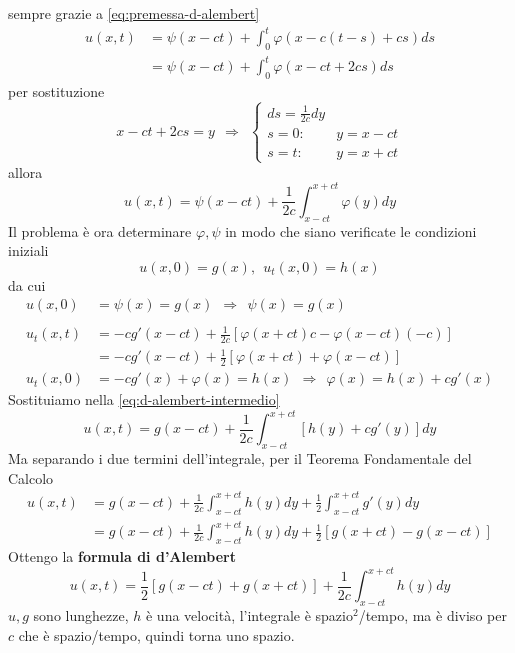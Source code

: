 \documentclass[10pt,a4paper,twoside,openright]{book}
\begin{document}
sempre grazie a \eqref{eq:premessa-d-alembert}
\begin{align*}
	u( x,t) & =\psi ( x-ct) +\int ^{t}_{0} \varphi ( x-c( t-s) +cs) ds \\
	        & =\psi ( x-ct) +\int ^{t}_{0} \varphi ( x-ct+2cs) ds      
\end{align*}
per sostituzione
\begin{equation*}
	x-ct+2cs=y\ \ \Rightarrow \ \ \begin{cases}
	ds=\frac{1}{2c} dy & \\
	s=0: & y=x-ct\\
	s=t: & y=x+ct
	\end{cases}
\end{equation*}
allora
\begin{equation}
	u( x,t) =\psi ( x-ct) +\frac{1}{2c}\int ^{x+ct}_{x-ct} \varphi ( y) dy
	\label{eq:d-alembert-intermedio}
\end{equation}
Il problema è ora determinare $\varphi ,\psi $ in modo che siano verificate le condizioni iniziali
\begin{equation*}
	u( x,0) =g( x) ,\ \ u_{t}( x,0) =h( x)
\end{equation*}
da cui
\begin{align*}
	u( x,0)     & =\psi ( x) =g( x) \ \ \Rightarrow \ \ \boxed{\psi ( x) =g( x)}                          \\
	            &                                                                                         \\
	u_{t}( x,t) & =-cg'( x-ct) +\frac{1}{2c}[ \varphi ( x+ct) c-\varphi ( x-ct)( -c)]                     \\
	            & =-cg'( x-ct) +\frac{1}{2}[ \varphi ( x+ct) +\varphi ( x-ct)]                            \\
	u_{t}( x,0) & =-cg'( x) +\varphi ( x) =h( x) \ \ \Rightarrow \ \ \boxed{\varphi ( x) =h( x) +cg'( x)} 
\end{align*}
Sostituiamo nella \eqref{eq:d-alembert-intermedio}
\begin{equation*}
	u( x,t) =g( x-ct) +\frac{1}{2c}\int ^{x+ct}_{x-ct}[ h( y) +cg'( y)] dy
\end{equation*}
Ma separando i due termini dell'integrale, per il Teorema Fondamentale del Calcolo
\begin{align*}
	u( x,t) & =g( x-ct) +\frac{1}{2c}\int ^{x+ct}_{x-ct} h( y) dy+\frac{1}{2}\int ^{x+ct}_{x-ct} g'( y) dy \\
	        & =g( x-ct) +\frac{1}{2c}\int ^{x+ct}_{x-ct} h( y) dy+\frac{1}{2}[ g( x+ct) -g( x-ct)]         
\end{align*}
Ottengo la \textbf{formula di d'Alembert}
\begin{equation}
	\boxed{u( x,t) =\frac{1}{2}[ g( x-ct) +g( x+ct)] +\frac{1}{2c}\int ^{x+ct}_{x-ct} h( y) dy}
\end{equation}
$u,g$ sono lunghezze, $h$ è una velocità, l'integrale è spazio$^{2}$/tempo, ma è diviso per $c$ che è spazio/tempo, quindi torna uno spazio.
\end{document}

